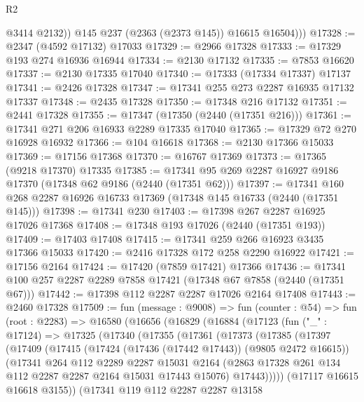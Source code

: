 \begin{lexlean}{R2}
\begin{coremodule}
              @3414
              @2132))
          @145
          @237
          (@2363 (@2373 @145))
          @16615
          @16504)))
@17328 := @2347 (@4592 @17132) @17033
@17329 := @2966 @17328
@17333 := @17329 @193 @274 @16936 @16944
@17334 := @2130 @17132
@17335 := @7853 @16620
@17337 := @2130 @17335 @17040
@17340 := @17333 (@17334 @17337) @17137
@17341 := @2426 @17328
@17347 := @17341 @255 @273 @2287 @16935 @17132 @17337
@17348 := @2435 @17328
@17350 := @17348 @216 @17132
@17351 := @2441 @17328
@17355 := @17347 (@17350 (@2440 (@17351 @216)))
@17361 := @17341 @271 @206 @16933 @2289 @17335 @17040
@17365 := @17329 @72 @270 @16928 @16932
@17366 := @104 @16618
@17368 := @2130 @17366 @15033
@17369 := @17156 @17368
@17370 := @16767 @17369
@17373 := @17365 (@9218 @17370) @17335
@17385 := @17341 @95 @269 @2287 @16927 @9186 @17370 (@17348 @62 @9186 (@2440 (@17351 @62)))
@17397 := @17341 @160 @268 @2287 @16926 @16733 @17369 (@17348 @145 @16733 (@2440 (@17351 @145)))
@17398 := @17341 @230
@17403 := @17398 @267 @2287 @16925 @17026 @17368
@17408 := @17348 @193 @17026 (@2440 (@17351 @193))
@17409 := @17403 @17408
@17415 := @17341 @259 @266 @16923 @3435 @17366 @15033
@17420 := @2416 @17328 @172 @258 @2290 @16922
@17421 := @17156 @2164
@17424 := @17420 (@7859 @17421) @17366
@17436 := @17341 @100 @257 @2287 @2289 @7858 @17421 (@17348 @67 @7858 (@2440 (@17351 @67)))
@17442 := @17398 @112 @2287 @2287 @17026 @2164 @17408
@17443 := @2460 @17328
@17509 := fun (message : @9008) =>
  fun (counter : @54) =>
  fun (root : @2283) =>
  @16580
    (@16656
      (@16829
        (@16884
          (@17123
            (fun ("_" : @17124) =>
            @17325
              (@17340
                (@17355
                  (@17361
                    (@17373
                      (@17385
                        (@17397
                          (@17409
                            (@17415
                              (@17424 (@17436 (@17442 @17443)) (@9805 @2472 @16615))
                              (@17341
                                @264
                                @112
                                @2289
                                @2287
                                @15031
                                @2164
                                (@2863 @17328 @261 @134 @112 @2287 @2287 @2164 @15031 @17443 @15076)
                                @17443)))))
                      (@17117 @16615 @16618 @3155))
                    (@17341
                      @119
                      @112
                      @2287
                      @2287
                      @13158

\end{coremodule}
\end{lexlean}

